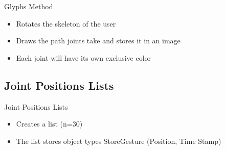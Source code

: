 \documentclass{beamer}
\begin{document}
\begin{frame}{Glyphs Method}
 \begin{itemize}
 \item Rotates the skeleton of the user
  \item Draws the path joints take and  stores it in an image
  \item Each joint will have its own exclusive color
 \end{itemize}
\end{frame}
\subsection{Joint Positions Lists}
\begin{frame}{Joint Positions Lists}
 \begin{itemize}
  \item Creates a list (n=30)
  \item The list stores object types StoreGesture (Position, Time Stamp)
 \end{itemize}
\end{frame}
\end{document}
